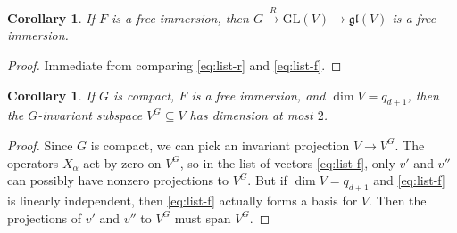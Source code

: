 \documentclass[a4paper,10pt,leqno]{article}
\numberwithin{equation}{section}
\theoremstyle{plain}
\newtheorem{cor}[thm]{Corollary}
\theoremstyle{definition}
\theoremstyle{remark}
\newcommand{\fr}{\mathfrak}
\newcommand{\GL}{\mathrm{GL}}
\begin{document}
\begin{cor}\label{cor:partials}
If $F$ is a free immersion, then $G \xrightarrow{R} \GL(V) \to \fr{gl}(V)$ is a free immersion.
\end{cor}

\begin{proof}
Immediate from comparing \eqref{eq:list-r} and \eqref{eq:list-f}.
\end{proof}

\begin{cor}\label{cor:dim-2}
If $G$ is compact, $F$ is a free immersion, and $\dim V = q_{d + 1}$, then the $G$-invariant subspace $V^G \subseteq V$ has dimension at most $2$.
\end{cor}

\begin{proof}
Since $G$ is compact, we can pick an invariant projection $V \to V^G$.
The operators $X_\alpha$ act by zero on $V^G$, so in the list of vectors \eqref{eq:list-f}, only $v'$ and $v''$ can possibly have nonzero projections to $V^G$.
But if $\dim V = q_{d + 1}$ and \eqref{eq:list-f} is linearly independent, then \eqref{eq:list-f} actually forms a basis for $V$.
Then the projections of $v'$ and $v''$ to $V^G$ must span $V^G$.
\end{proof}
\end{document}
